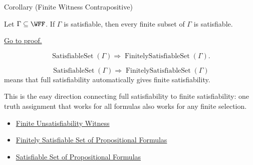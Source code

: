\begin{corollarybox}{Corollary (Finite Witness Contrapositive)}
\begin{corollary}
\label{cor:finite-unsatisfiability-witness-contrapositive-propositional-logic}
Let \(\Gamma\subseteq\WFF\). If \(\Gamma\) is satisfiable, then every finite
subset of \(\Gamma\) is satisfiable.

\medskip
\noindent\hyperref[prf:finite-unsatisfiability-witness-contrapositive-propositional-logic]{Go to proof.}
\end{corollary}
\end{corollarybox}

\begin{remark*}
\[
\operatorname{SatisfiableSet}(\Gamma)
\Rightarrow
\operatorname{FinitelySatisfiableSet}(\Gamma).
\]
\end{remark*}

\begin{remark*}
\[
\operatorname{SatisfiableSet}(\Gamma)
\Rightarrow
\operatorname{FinitelySatisfiableSet}(\Gamma)
\]
means that full satisfiability automatically gives finite satisfiability.
\end{remark*}

\begin{remark*}[Interpretation]
This is the easy direction connecting full satisfiability to finite
satisfiability: one truth assignment that works for all formulas also works
for any finite selection.
\end{remark*}

\begin{dependencies}
\begin{itemize}
  \item \hyperref[thm:finite-unsatisfiability-witness-propositional-logic]{Finite Unsatisfiability Witness}
  \item \hyperref[def:finitely-satisfiable-set-of-propositional-formulas]{Finitely Satisfiable Set of Propositional Formulas}
  \item \hyperref[def:satisfiable-set-of-propositional-formulas]{Satisfiable Set of Propositional Formulas}
\end{itemize}
\end{dependencies}
